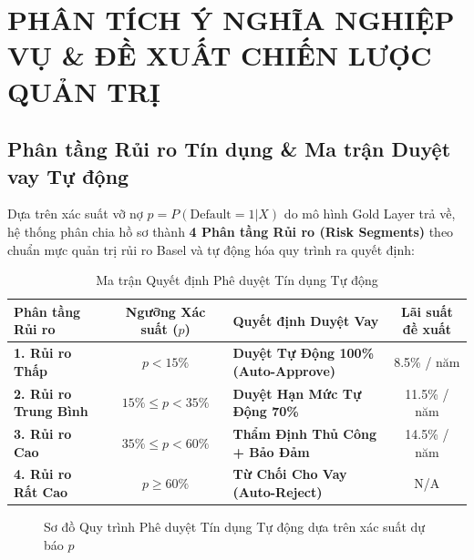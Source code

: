 \chapter{PHÂN TÍCH Ý NGHĨA NGHIỆP VỤ \& ĐỀ XUẤT CHIẾN LƯỢC QUẢN TRỊ}

\section{Phân tầng Rủi ro Tín dụng \& Ma trận Duyệt vay Tự động}
Dựa trên xác suất vỡ nợ $p = P(\text{Default}=1 | X)$ do mô hình Gold Layer trả về, hệ thống phân chia hồ sơ thành \textbf{4 Phân tầng Rủi ro (Risk Segments)} theo chuẩn mực quản trị rủi ro Basel \cite{basel2017} và tự động hóa quy trình ra quyết định:

\begin{table}[h!]
\centering
\caption{Ma trận Quyết định Phê duyệt Tín dụng Tự động}
\label{tab:decision_matrix}
\begin{tabularx}{\textwidth}{|l|c|X|c|}
\hline
\textbf{Phân tầng Rủi ro} & \textbf{Ngưỡng Xác suất ($p$)} & \textbf{Quyết định Duyệt Vay} & \textbf{Lãi suất đề xuất} \\ \hline
\textbf{1. Rủi ro Thấp} & $p < 15\%$ & \textbf{Duyệt Tự Động 100\% (Auto-Approve)} & 8.5\% / năm \\ \hline
\textbf{2. Rủi ro Trung Bình} & $15\% \le p < 35\%$ & \textbf{Duyệt Hạn Mức Tự Động 70\%} & 11.5\% / năm \\ \hline
\textbf{3. Rủi ro Cao} & $35\% \le p < 60\%$ & \textbf{Thẩm Định Thủ Công + Bảo Đảm} & 14.5\% / năm \\ \hline
\textbf{4. Rủi ro Rất Cao} & $p \ge 60\%$ & \textbf{Từ Chối Cho Vay (Auto-Reject)} & N/A \\ \hline
\end{tabularx}
\end{table}

\begin{figure}[h!]
\centering
\caption{Sơ đồ Quy trình Phê duyệt Tín dụng Tự động dựa trên xác suất dự báo $p$}
\label{fig:sodo_decision_process}
\end{figure}

